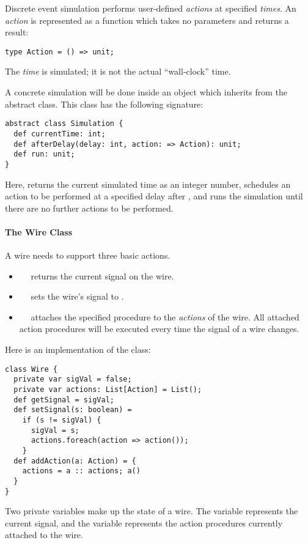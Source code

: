 {Discrete event simulation performs user-defined \emph{actions} at
specified \emph{times}.  
An {\em action} is represented as a function which takes no parameters and
returns a  result:
\begin{lstlisting}
type Action = () => unit;
\end{lstlisting}
The \emph{time} is simulated; it is not the actual ``wall-clock'' time.

A concrete simulation will be done inside an object which inherits
from the abstract  class. This class has the following
signature:

\begin{lstlisting}
abstract class Simulation {
  def currentTime: int;
  def afterDelay(delay: int, action: => Action): unit;
  def run: unit;
}
\end{lstlisting}
Here,
 returns the current simulated time as an integer
number,
 schedules an action to be performed at a specified
delay after , and
 runs the simulation until there are no further actions to be 
performed.

\paragraph{The Wire Class}
A wire needs to support three basic actions.
\begin{itemize}
\item[]
~~ returns the current signal on the wire.
\item[]
~~ sets the wire's signal to .
\item[]
~~ attaches the specified procedure
 to the {\em actions} of the wire. All attached action
procedures will be executed every time the signal of a wire changes.
\end{itemize}
Here is an implementation of the  class:
\begin{lstlisting}
class Wire {
  private var sigVal = false;
  private var actions: List[Action] = List();
  def getSignal = sigVal;
  def setSignal(s: boolean) = 
    if (s != sigVal) {
      sigVal = s;
      actions.foreach(action => action()); 
    }
  def addAction(a: Action) = {
    actions = a :: actions; a()
  }
}
\end{lstlisting}
Two private variables make up the state of a wire.  The variable
 represents the current signal, and the variable
 represents the action procedures currently attached to
the wire.

}
